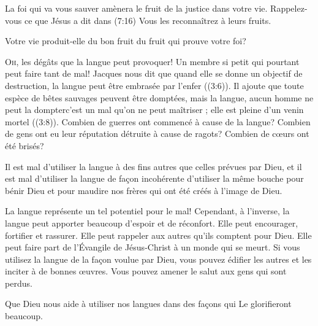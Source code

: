 La foi qui va vous sauver amènera le fruit de la justice dans votre vie.
 Rappelez-vous ce que Jésus a dit dans (7:16)\frcolon {}
 \Og Vous les reconnaîtrez à leurs fruits. \Fg{}

Votre vie produit-elle du bon fruit \ocadr du fruit qui prouve votre foi? 

\dvrule







\lettrine{O}{h,} les dégâts que la langue peut provoquer!
 Un membre si petit qui pourtant peut faire tant de mal!
 Jacques nous dit que quand elle se donne un objectif de destruction,
 la langue peut être \Og embrasée par l'enfer \Fg{} ((3:6)).
 Il ajoute que toute espèce de bêtes sauvages peuvent être domptées,
 \Og mais la langue, aucun homme ne peut la dompter\frcolon c'est un mal
 qu'on ne peut maîtriser ; elle est pleine d'un venin mortel \Fg{}
 ((3:8)).
 Combien de guerres ont commencé à cause de la langue?
 Combien de gens ont eu leur réputation détruite à cause de ragots?
 Combien de c\oe{}urs ont été brisés? 


Il est mal d'utiliser la langue à des fins autres
 que celles prévues par Dieu, et il est mal d'utiliser la langue
 de fa\c{c}on incohérente \ocadr d'utiliser la même bouche pour bénir Dieu
 et pour maudire nos frères qui ont été créés à l'image de Dieu. 

La langue représente un tel potentiel pour le mal!
 Cependant, à l'inverse, la langue peut apporter beaucoup d'espoir
 et de réconfort. Elle peut encourager, fortifier et rassurer.
 Elle peut rappeler aux autres qu'ils comptent pour Dieu.
 Elle peut faire part de l'Évangile 
 de Jésus-Christ à un monde qui se meurt.
 Si vous utilisez la langue de la fa\c{c}on voulue par Dieu,
 vous pouvez édifier les autres et les inciter à de bonnes \oe{}uvres.
 Vous pouvez amener le salut aux gens qui sont perdus. 

Que Dieu nous aide à utiliser nos langues dans des fa\c{c}ons 
 qui Le glorifieront beaucoup. 

\dvrule



